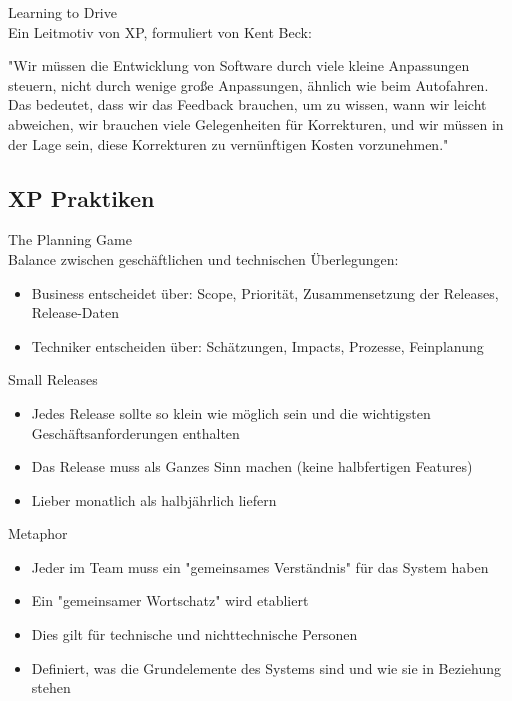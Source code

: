 \begin{concept}{Learning to Drive}\\
    Ein Leitmotiv von XP, formuliert von Kent Beck:
    
    "Wir müssen die Entwicklung von Software durch viele kleine Anpassungen steuern, nicht durch wenige große Anpassungen, ähnlich wie beim Autofahren. Das bedeutet, dass wir das Feedback brauchen, um zu wissen, wann wir leicht abweichen, wir brauchen viele Gelegenheiten für Korrekturen, und wir müssen in der Lage sein, diese Korrekturen zu vernünftigen Kosten vorzunehmen."
\end{concept}

\subsection{XP Praktiken}

\begin{concept}{The Planning Game}\\
    Balance zwischen geschäftlichen und technischen Überlegungen:
    \begin{itemize}
        \item Business entscheidet über: Scope, Priorität, Zusammensetzung der Releases, Release-Daten
        \item Techniker entscheiden über: Schätzungen, Impacts, Prozesse, Feinplanung
    \end{itemize}
\end{concept}

\begin{concept}{Small Releases}\\
    \begin{itemize}
        \item Jedes Release sollte so klein wie möglich sein und die wichtigsten Geschäftsanforderungen enthalten
        \item Das Release muss als Ganzes Sinn machen (keine halbfertigen Features)
        \item Lieber monatlich als halbjährlich liefern
    \end{itemize}
\end{concept}

\begin{concept}{Metaphor}\\
    \begin{itemize}
        \item Jeder im Team muss ein "gemeinsames Verständnis" für das System haben
        \item Ein "gemeinsamer Wortschatz" wird etabliert
        \item Dies gilt für technische und nichttechnische Personen
        \item Definiert, was die Grundelemente des Systems sind und wie sie in Beziehung stehen
    \end{itemize}
\end{concept}

